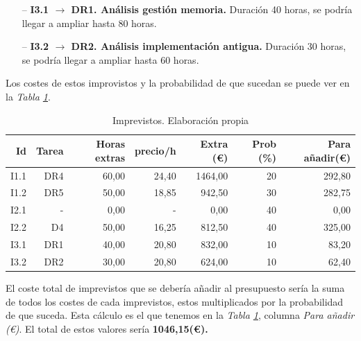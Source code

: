 \documentclass[12pt]{article}
\begin{document}
        \begin{itemize}
        \setlength{\itemindent}{2em}
            \item[--] \textbf{I3.1 $\rightarrow$ DR1. Análisis gestión memoria.} Duración 40 horas, se podría llegar a ampliar hasta 80 horas.
            \item[--] \textbf{I3.2 $\rightarrow$ DR2. Análisis implementación antigua.} Duración 30 horas, se podría llegar a ampliar hasta 60 horas.
        \end{itemize}
    Los costes de estos improvistos y la probabilidad de que sucedan se puede ver en la \textit{Tabla \ref{tab:imprevistos}}.
    \begin{table}[H]
        \begin{center}
            \begin{tabular}{ |r|r|r|r|r|r|r| } \hline
                Id & Tarea & Horas extras & precio/h          & Extra (\euro)& Prob (\%) &  Para añadir(\euro) \\ \hline
                I1.1        & DR4            & 60,00                  & 24,40                & 1464,00              & 20 & 292,80 \\ \hline
                I1.2        & DR5            & 50,00                  & 18,85                & 942,50               & 30 & 282,75\\ \hline
                I2.1        & -              & 0,00                   & -                    & 0,00                 & 40 & 0,00\\ \hline
                I2.2        & D4             & 50,00                  & 16,25                & 812,50               & 40 & 325,00\\ \hline
                I3.1        & DR1            & 40,00                  & 20,80                & 832,00               & 10 & 83,20\\ \hline
                I3.2        & DR2            & 30,00                  & 20,80                & 624,00               & 10 & 62,40\\ \hline
            \end{tabular}
        \caption{Imprevistos. Elaboración propia}
        \label{tab:imprevistos}
        \end{center}
        \end{table}
        El coste total de imprevistos que se debería añadir al presupuesto sería la suma de todos los costes de cada imprevistos, estos multiplicados por la probabilidad de que suceda. Esta cálculo es el que tenemos en la \textit{Tabla \ref{tab:imprevistos}}, columna \textit{Para añadir (\euro)}. El total de estos valores sería \textbf{1046,15(\euro).}
\end{document}
